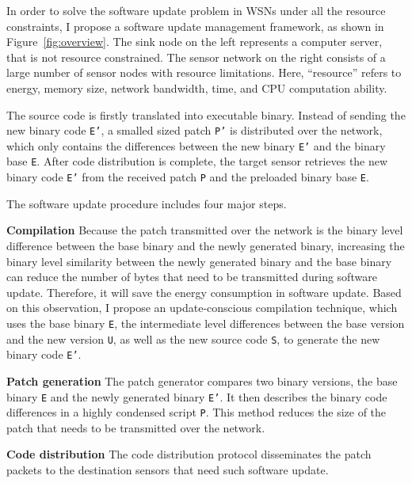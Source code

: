 In order to solve the software update problem in WSNs under all the resource constraints, I propose a software update management framework, as shown in Figure~\ref{fig:overview}. 
The sink node on the left represents a computer server, that is not resource constrained. The sensor network on the right consists of a large number of sensor nodes with resource limitations. Here, ``resource'' refers to energy, memory size,  network bandwidth, time, and CPU computation ability.

The source code is firstly translated into executable binary. Instead of sending the new binary code {\tt E'}, a smalled sized patch{ \tt P'} is distributed over the network, which only contains the differences between the new binary {\tt E'} and the binary base {\tt E}.  After code distribution is complete, the target sensor retrieves the new binary code {\tt E'} from the received patch {\tt P} and the preloaded binary base {\tt E}. 

The software update procedure includes four major steps.

\textbf{Compilation} 
Because the patch transmitted over the network is the binary level difference between the base binary and the newly generated binary, increasing the binary level similarity between the newly generated binary and the base binary can reduce the number of bytes that need to be transmitted during software update. Therefore, it will save the energy consumption in software update. 
Based on this observation, I propose an update-conscious compilation technique, which uses the base binary {\tt E}, the intermediate level differences between the base version and the new version {\tt U}, as well as the new source code {\tt S}, to generate the new binary code {\tt E'}. 
	
\textbf{Patch generation}
The patch generator compares two binary versions, the base binary {\tt E} and the newly generated binary {\tt E'}. It then describes the binary code differences in a highly condensed script {\tt P}. This method reduces the size of the patch that needs to be transmitted over the network. 

\textbf{Code distribution}
The code distribution protocol disseminates the patch packets to the destination sensors that need such software update.



